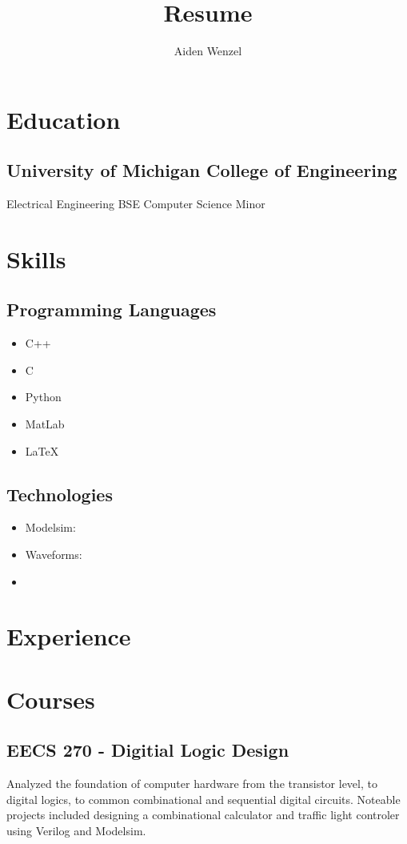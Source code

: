 \documentclass{article}
\title{Resume}
\author{Aiden Wenzel}
\begin{document}
		
\maketitle

\section{Education}
\subsection{University of Michigan College of Engineering}
Electrical Engineering BSE
Computer Science Minor

\section{Skills}
\subsection{Programming Languages}
\begin{itemize}
	\item C++ 
	\item C
	\item Python
	\item MatLab
	\item \LaTeX
\end{itemize}

\subsection{Technologies}
\begin{itemize}
	\item Modelsim: 
	\item Waveforms: 
	\item 
\end{itemize}

\section{Experience}

\section{Courses}
\subsection{EECS 270 - Digitial Logic Design}
Analyzed the foundation of computer hardware from the transistor level,
to digital logics, to common combinational and sequential digital circuits. 
Noteable projects included designing a combinational calculator and traffic light controler
using Verilog and Modelsim.
\end{document}
